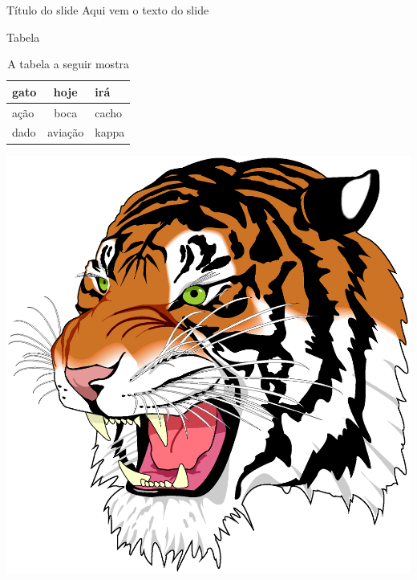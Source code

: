 \documentclass[pdf,slideColor,colorBG]{prosper}
\begin{document}
\begin{slide}{Título do slide}
Aqui vem o texto do slide
\end{slide}

\begin{slide}{Tabela}

\begin{multicols}{2}
\begin{table}[!htb]
\caption{A tabela a seguir mostra}
\begin{center}
\begin{tabular}{|l|c|l|} \hline
gato & hoje & irá\\ \hline
ação & boca & cacho\\
dado & aviação & kappa\\ \hline
\end{tabular}
\end{center}
\end{table}

\begin{center}
\includegraphics[width=0.9\linewidth]{tiger.eps}
\end{center}
\end{multicols}
\end{slide}

\end{document}
